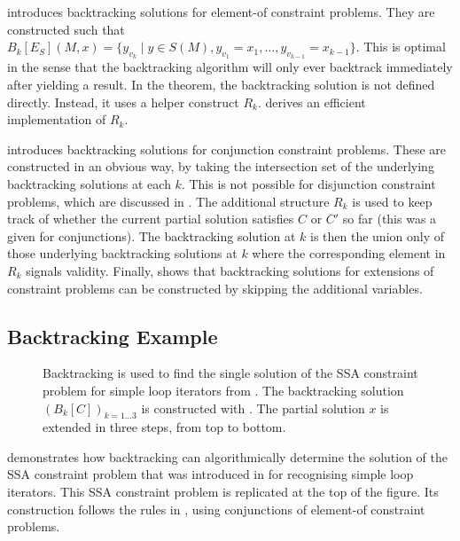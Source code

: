      introduces backtracking solutions for element-of
    constraint problems.
    They are constructed such that
    $B_k[E_S](M,x)=\{y_{v_k}\mid y\in S(M), y_{v_1}=x_1,\dots,y_{v_{k-1}}=x_{k-1}\}$.
    This is optimal in the sense that the backtracking algorithm will only ever
    backtrack immediately after yielding a result.
    In the theorem, the backtracking solution is not defined directly.
    Instead, it uses a helper construct $R_k$.
     derives an efficient implementation of $R_k$.

     introduces backtracking solutions for conjunction
    constraint problems.
    These are constructed in an obvious way, by taking the intersection set of
    the underlying backtracking solutions at each $k$.
    This is not possible for disjunction constraint problems, which are
    discussed in .
    The additional structure $R_k$ is used to keep track of whether the current
    partial solution satisfies $C$ or $C'$ so far
    (this was a given for conjunctions).
    The backtracking solution at $k$ is then the union only of those underlying
    backtracking solutions at $k$ where the corresponding element in $R_k$
    signals validity.
    Finally,  shows that backtracking solutions for extensions
    of constraint problems can be constructed by skipping the
    additional variables.

\subsection{Backtracking Example}

\begin{figure}[p]
    
    \caption{Backtracking is used to find the single solution of the
             SSA constraint problem for simple loop iterators from
             .
             The backtracking solution $(B_k[C])_{k=1\dots3}$ is constructed
             with .
             The partial solution $x$  is extended in three steps, from top to
             bottom.}
    \label{fig:backtracsol}
\end{figure}

     demonstrates how backtracking can algorithmically
    determine the solution of the SSA constraint problem that was introduced in
     for recognising simple loop iterators.
    This SSA constraint problem is replicated at the top of the figure.
    Its construction follows the rules in
    , using conjunctions
    of element-of constraint problems.

